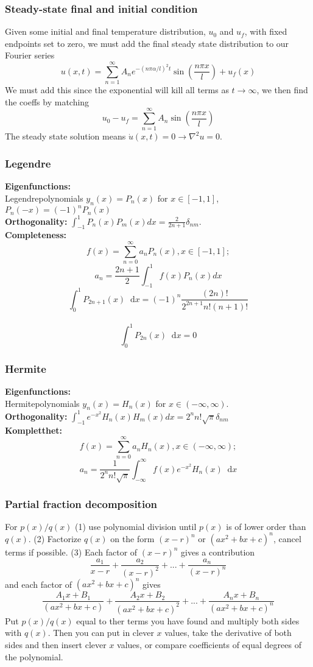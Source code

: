 \documentclass[a4paper, 10pt]{article}
\newcommand*\diff{\mathop{}\!\mathrm{d}}
\begin{document}
\begin{multicols*}{3}
\subsubsection*{\small Steady-state final and initial condition}
Given some initial and final temperature distribution, $u_0$ and $u_f$, with fixed endpoints set to zero, we must add the final steady state distribution to our Fourier series
$$ u(x,t) = \sum_{n=1}^{\infty} A_ne^{-(n\pi\alpha/l)^2t}\sin{\left( \frac{n\pi x}{l} \right)} + u_f(x)$$
We must add this since the exponential will kill all terms as $t\rightarrow\infty$, we then find the coeffs by matching
$$ u_0-u_f = \sum_{n=1}^{\infty} A_n\sin{\left( \frac{n\pi x}{l} \right)}$$
The steady state solution means $\dot{u}(x,t)=0\rightarrow \nabla^2 u = 0$.
\subsubsection*{\small Legendre}
\textbf{Eigenfunctions:} \\
Legendrepolynomials $y_n(x)=P_n(x)$ for $x\in[-1,1]$, $P_n(-x) = (-1)^nP_n(x)$ \\
\textbf{Orthogonality: }
$  \int_{-1}^1 P_n(x)P_m(x)dx=\frac{2}{2n+1}\delta_{nm}.$ \\
\textbf{Completeness: }
$$
f(x)=\sum_{n=0}^\infty a_nP_n(x),x\in[-1,1];$$
$$a_n=\frac{2n+1}{2}\int_{-1}^1 f(x) P_n(x)dx
$$
$$ \int_0^1 P_{2n+1}(x) \diff x = (-1)^n \frac{(2n)!}{2^{2n+1}n!(n+1)!}$$\\
$$ \int_0^1 P_{2n}(x) \diff x = 0 $$

\subsubsection*{\small Hermite}
\textbf{Eigenfunctions:}\\
Hermitepolynomials $y_n(x)=H_n(x)$ for $x\in(-\infty,\infty)$. \\
\textbf{Orthogonality: }
$\int_{-1}^1 e^{-x^2}H_n(x)H_m(x)dx=2^n n! \sqrt{\pi}\delta_{nm} $ \\
\textbf{Kompletthet:}$$
f(x)=\sum_{n=0}^\infty a_nH_n(x),x\in(-\infty,\infty);$$
$$a_n=\frac{1}{2^n n! \sqrt{\pi}}\int_{-\infty}^\infty
f(x) e^{-x^2} H_n(x)\diff x$$

\subsubsection*{\small Partial fraction decomposition}
For $p(x)/q(x)$ (1) use polynomial division until $p(x)$ is of lower order than $q(x)$. (2) Factorize $q(x)$ on the form $(x-r)^n$ or $(ax^2 + bx + c)^n$, cancel terms if possible. (3) Each factor of $(x-r)^n$ gives a contribution
$$ \frac{a_1}{x-r} + \frac{a_2}{(x-r)^2}+...+\frac{a_n}{(x-r)^n}$$
and each factor of $(ax^2 + bx + c)^n$ gives
$$ \frac{A_1x+B_1}{(ax^2 + bx + c)} + \frac{A_2x+B_2}{(ax^2 + bx + c)^2} + ... + \frac{A_nx+B_n}{(ax^2 + bx + c)^n}$$
Put $p(x)/q(x)$ equal to ther terms you have found and multiply both sides with $q(x)$. Then you can put in clever $x$ values, take the derivative of both sides and then insert clever $x$ values, or compare coefficients of equal degrees of the polynomial.
\newpage


\end{multicols*}
\end{document}
